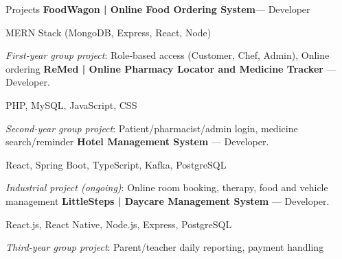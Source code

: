 \begin{rubric}{Projects}
\entry*[] \textbf{FoodWagon | Online Food Ordering System}— Developer
            \par MERN Stack (MongoDB, Express, React, Node)
            \par \textit{First-year group project}: Role-based access (Customer, Chef, Admin),
                 Online ordering
%
\entry*[] \textbf{ReMed | Online Pharmacy Locator and Medicine Tracker} — Developer.
            \par PHP, MySQL, JavaScript, CSS
            \par \textit{Second-year group project}: Patient/pharmacist/admin login, medicine search/reminder
%
\entry*[] \textbf{Hotel Management System} — Developer.
            \par React, Spring Boot, TypeScript, Kafka, PostgreSQL
            \par \textit{Industrial project (ongoing)}: Online room booking, therapy, 
             food and vehicle management
%
\entry*[] \textbf{LittleSteps | Daycare Management System} — Developer.
            \par React.js, React Native, Node.js, Express, PostgreSQL
            \par \textit{Third-year group project}: Parent/teacher daily reporting, 
             payment handling

\end{rubric}


